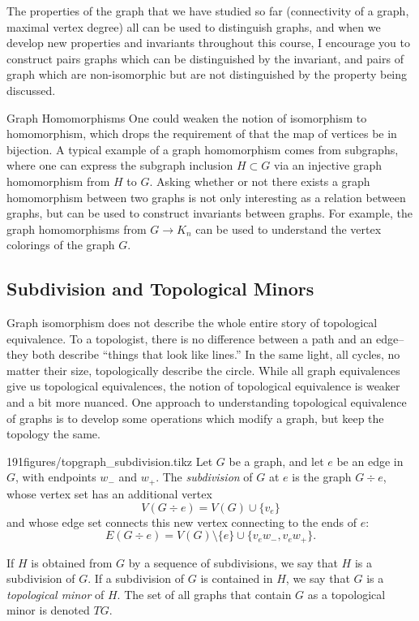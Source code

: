 The properties of the graph that we have studied so far (connectivity of a graph, maximal vertex degree) all can be used to distinguish graphs, and when we develop new properties and invariants throughout this course, I encourage you to construct pairs graphs which can be distinguished by the invariant, and pairs of graph which are non-isomorphic but are not distinguished by the property being discussed. 
\begin{projectdescription}{Graph Homomorphisms}
One could weaken the notion of isomorphism to homomorphism, which drops the \label{proj:graphhomo} requirement of  that the map of vertices be in bijection.
A typical example of a graph homomorphism comes from subgraphs, where one can express the subgraph inclusion  $H\subset G$ via an injective graph homomorphism from $H$ to $G$. 
Asking whether or not there exists a graph homomorphism between two graphs is not only interesting as a relation between graphs, but can be used to construct invariants between graphs.
For example, the graph homomorphisms from $G\to K_n$ can be used to understand the vertex colorings of the graph $G$. 
\end{projectdescription}

\subsection{Subdivision and Topological Minors}

Graph isomorphism does not describe the whole entire story of topological equivalence. 
To a topologist, there is no difference between a path and an edge-- they both describe ``things that look like lines.'' 
In the same light, all cycles, no matter their size, topologically describe the circle. 
While all graph equivalences give us topological equivalences, the notion of topological equivalence is weaker and a bit more nuanced. 
One approach to understanding topological equivalence of graphs is to develop some operations which modify a graph, but keep the topology the same.
\begin{definitionfigureenv}[Subdivision]{191figures/topgraph_subdivision.tikz}
	Let $G$ be a graph,  and let $e$ be an edge in $G$, with endpoints $w_-$ and $w_+$. 
	The \emph{subdivision} of $G$ at $e$ is the graph $G\div e$,  whose vertex set has an additional vertex
	\[
		V(G\div e)=V(G)\cup\{v_e\}
	\]
	and whose edge set connects this new vertex connecting to the ends of $e$:
	\[
		E(G\div e )=V(G)\setminus \{e\}\cup\{v_ew_-, v_ew_+\}.
	\] 
\end{definitionfigureenv}
If $H$ is obtained from $G$ by a sequence of subdivisions,  we say that $H$ is a subdivision of $G$. If a subdivision of $G$ is contained in $H$,  we say that $G$ is a \emph{topological minor} of $H$. The set of all graphs that contain $G$ as a topological minor is denoted $TG$.

